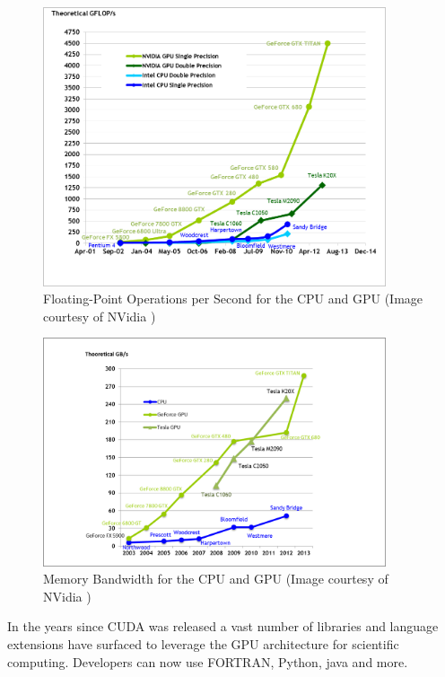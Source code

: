\documentclass{report}
\begin{document}
\begin{figure}
\centering
\includegraphics[width=0.9\textwidth]{gpu_content/nvidia_figures/floating-point-operations-per-second.png}
\caption{Floating-Point Operations per Second for the CPU and GPU (Image courtesy of NVidia \cite{CudaGuide2013})} 
\label{fig:floating-point-operations-per-second}
\end{figure}


\begin{figure}
\centering
\includegraphics[width=0.9\textwidth]{gpu_content/nvidia_figures/memory-bandwidth.png}
\caption{Memory Bandwidth for the CPU and GPU (Image courtesy of NVidia \cite{CudaGuide2013})} 
\label{fig:memory-bandwidth}
\end{figure}


In the years since CUDA was released a vast number of libraries and language extensions have surfaced to leverage the GPU architecture for scientific computing. Developers can now use FORTRAN, Python, java and more. 
\end{document}
